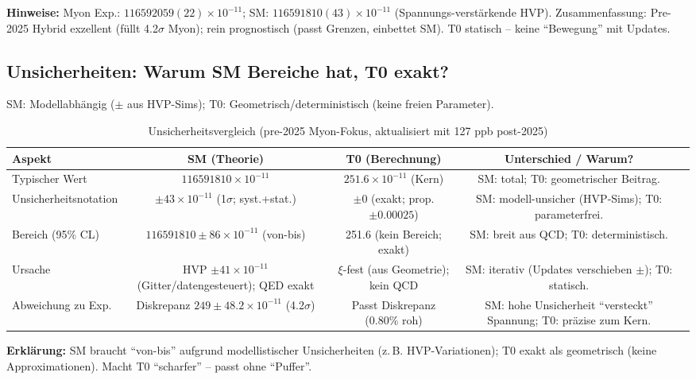 \documentclass[12pt,a4paper]{article}
\begin{document}
	\textbf{Hinweise:} Myon Exp.: $116592059(22) \times 10^{-11}$; SM: $116591810(43) \times 10^{-11}$ (Spannungs-verstärkende HVP). Zusammenfassung: Pre-2025 Hybrid exzellent (füllt 4.2$\sigma$ Myon); rein prognostisch (passt Grenzen, einbettet SM). T0 statisch -- keine ``Bewegung'' mit Updates.
	
	\subsection{Unsicherheiten: Warum SM Bereiche hat, T0 exakt?}
	
	SM: Modellabhängig ($\pm$ aus HVP-Sims); T0: Geometrisch/deterministisch (keine freien Parameter).
	
	\begin{table}[ht!]
		\centering
		\small
		\begin{adjustbox}{max width=\textwidth}
			\begin{tabular}{lcccr}
				\toprule
				Aspekt & SM (Theorie) & T0 (Berechnung) & Unterschied / Warum? \\
				\midrule
				Typischer Wert & $116591810 \times 10^{-11}$ & $251.6 \times 10^{-11}$ (Kern) & SM: total; T0: geometrischer Beitrag. \\
				Unsicherheitsnotation & $\pm 43 \times 10^{-11}$ (1$\sigma$; syst.+stat.) & $\pm 0$ (exakt; prop. $\pm 0.00025$) & SM: modell-unsicher (HVP-Sims); T0: parameterfrei. \\
				Bereich (95\% CL) & $116591810 \pm 86 \times 10^{-11}$ (von-bis) & 251.6 (kein Bereich; exakt) & SM: breit aus QCD; T0: deterministisch. \\
				Ursache & HVP $\pm 41 \times 10^{-11}$ (Gitter/datengesteuert); QED exakt & $\xi$-fest (aus Geometrie); kein QCD & SM: iterativ (Updates verschieben $\pm$); T0: statisch. \\
				Abweichung zu Exp. & Diskrepanz $249 \pm 48.2 \times 10^{-11}$ (4.2$\sigma$) & Passt Diskrepanz (0.80\% roh) & SM: hohe Unsicherheit ``versteckt'' Spannung; T0: präzise zum Kern. \\
				\bottomrule
			\end{tabular}
		\end{adjustbox}
		\caption{Unsicherheitsvergleich (pre-2025 Myon-Fokus, aktualisiert mit 127 ppb post-2025)}
		\label{tab:uncertainties}
	\end{table}
	
	\textbf{Erklärung:} SM braucht ``von-bis'' aufgrund modellistischer Unsicherheiten (z.\,B. HVP-Variationen); T0 exakt als geometrisch (keine Approximationen). Macht T0 ``scharfer'' -- passt ohne ``Puffer''.
	
\end{document}
